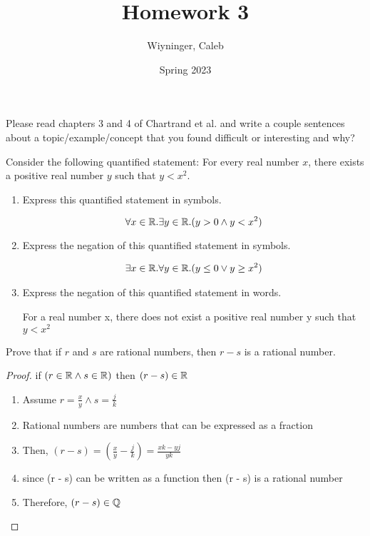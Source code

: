 \documentclass{homework}
\author{Wiyninger, Caleb}  %
\date{Spring 2023}  %
\title{Homework 3}
\begin{document}
 \maketitle

\question Please read chapters 3 and 4 of Chartrand et al. and write a couple sentences about a topic/example/concept that you found difficult or interesting and why?

\question Consider the following quantified statement: For every real number $x$, there exists a positive real number $y$ such that $y < x^2$.

\begin{enumerate}[label=(\alph*)]
	\item Express this quantified statement in symbols.
	\begin{sol}
		\[
			\forall x \in \mathbb{R}. \exists y \in \mathbb{R}.  (y > 0 \land y < x^2)
		\]
	\end{sol}
	\item Express the negation of this quantified statement in symbols.
	\begin{sol}	
		\begin{align*}
			\exists x \in \mathbb{R}. \forall y \in \mathbb{R}. (y \leq 0 \vee y \geq x^2)
		\end{align*}
	\end{sol}
	\item Express the negation of this quantified statement in words. \\
		  \begin{sol}
			For a real number x, there does not exist a positive real number y such that $y < x^2$
		  \end{sol}
\end{enumerate}

\question Prove that if $r$ and $s$ are rational numbers, then $r - s$ is a rational number.

\begin{sol}
	\begin{proof} if $(r \in \mathbb{R} \land s \in \mathbb{R})$ then $(r - s) \in \mathbb{R}$
		\begin{enumerate}
			\item Assume $r = \frac{x}{y} \land s = \frac{j}{k}$
			\item Rational numbers are numbers that can be expressed as a fraction
			\item Then, $ (r - s) = (\frac{x}{y} - \frac{j}{k}) = \frac{xk-yj}{yk}$
			\item since (r - s) can be written as a function then (r - s) is a rational number
			\item Therefore, $(r - s) \in \mathbb{Q}$
		\end{enumerate}
	\end{proof}
\end{sol}
\end{document}
